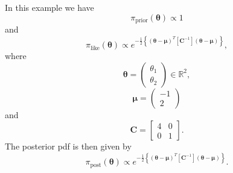In this example we have
\begin{equation*}
\pi_{\text{prior}}(\boldsymbol{\theta}) \varpropto 1
\end{equation*}
and
\begin{equation*}
\pi_{\text{like}}(\boldsymbol{\theta}) \varpropto e^{-\frac{1}{2}\left\{(\boldsymbol{\theta}-\boldsymbol{\mu})^T[\mathbf{C}^{-1}](\boldsymbol{\theta}-\boldsymbol{\mu})\right\}},
\end{equation*}
where
\begin{equation*}
\boldsymbol{\theta} = 
\left(
\begin{array}{c}
\theta_1 \\
\theta_2
\end{array}
\right)\in \mathbb{R}^2,
\end{equation*}
%
\begin{equation}\label{eq-example-mu}
\boldsymbol{\mu} = 
\left(
\begin{array}{c}
-1 \\
2
\end{array}
\right)
\end{equation}
and
\begin{equation}\label{eq-example-cov-mat}
\mathbf{C} = 
\left[
\begin{array}{cc}
4 & 0 \\
0 & 1
\end{array}
\right].
\end{equation}
The posterior pdf is then given by
\begin{equation}\label{eq-example-post}
\pi_{\text{post}}(\boldsymbol{\theta}) \varpropto e^{-\frac{1}{2}\left\{(\boldsymbol{\theta}-\boldsymbol{\mu})^T[\mathbf{C}^{-1}](\boldsymbol{\theta}-\boldsymbol{\mu})\right\}}.
\end{equation}

